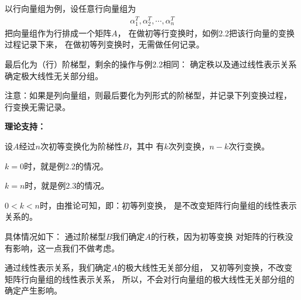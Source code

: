 \documentclass{article}
\begin{document}
以行向量组为例，设任意行向量组为
\begin{align*}
  \alpha_1^T, \alpha_2^T, \cdots, \alpha_n^T
\end{align*}
把向量组作为行排成一个矩阵$A$，
在做初等行变换时，如例2.2把该行向量的变换过程记录下来，
在做初等列变换时，无需做任何记录。

最后化为（行）阶梯型，剩余的操作与例2.2相同：
确定秩以及通过线性表示关系确定极大线性无关部分组。

注意：如果是列向量组，则最后要化为列形式的阶梯型，并记录下列变换过程，
行变换无需记录。

\textbf{理论支持：}

设$A$经过$n$次初等变换化为阶梯性$B$，其中
有$k$次列变换，$n - k$次行变换。

$k = 0$时，就是例2.2的情况。

$k = n$时，就是例2.3的情况。

$0 < k < n$时，由推论可知，即：初等列变换，
是不改变矩阵行向量组的线性表示关系的。

具体情况如下：
通过阶梯型$B$我们确定$A$的行秩，因为初等变换
对矩阵的行秩没有影响，这一点我们不做考虑。

通过线性表示关系，我们确定$A$的极大线性无关部分组，
又初等列变换，不改变矩阵行向量组的线性表示关系，
所以，不会对行向量组的极大线性无关部分组的确定产生影响。
\end{document}
